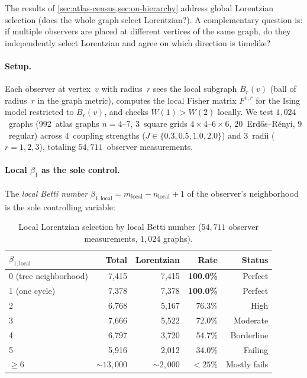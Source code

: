 \documentclass[11pt]{article}
\theoremstyle{definition}
\theoremstyle{remark}
\begin{document}
The results of \cref{sec:atlas-census,sec:on-hierarchy} address global
Lorentzian selection (does the whole graph select Lorentzian?). A
complementary question is: if multiple observers are placed at different
vertices of the same graph, do they independently select Lorentzian and
agree on which direction is timelike?

\paragraph{Setup.}
Each observer at vertex~$v$ with radius~$r$ sees the local subgraph
$B_r(v)$ (ball of radius~$r$ in the graph metric), computes the local
Fisher matrix $F^{v,r}$ for the Ising model restricted to $B_r(v)$,
and checks $W(1) > W(2)$ locally.
We test $1{,}024$~graphs (992~atlas graphs $n = 4$--$7$, $3$~square grids
$4{\times}4$--$6{\times}6$, $20$~Erd\H{o}s--R\'{e}nyi, $9$~regular) across
4~coupling strengths ($J \in \{0.3, 0.5, 1.0, 2.0\}$) and 3~radii
($r = 1, 2, 3$), totaling $54{,}711$~observer measurements.

\paragraph{Local $\beta_1$ as the sole control.}
The \emph{local Betti number} $\beta_{1,\mathrm{local}} = m_{\mathrm{local}} - n_{\mathrm{local}} + 1$
of the observer's neighborhood is the sole controlling variable:

\begin{table}[htbp]
\centering
\caption{Local Lorentzian selection by local Betti number ($54{,}711$ observer
measurements, $1{,}024$ graphs).}
\label{tab:multi-observer-beta1}
\begin{tabular}{@{}lrrrr@{}}
\toprule
$\beta_{1,\mathrm{local}}$ & Total & Lorentzian & Rate & Status \\
\midrule
0 (tree neighborhood)  & 7,415 & 7,415 & \textbf{100.0\%} & Perfect \\
1 (one cycle)          & 7,378 & 7,378 & \textbf{100.0\%} & Perfect \\
2 & 6,768 & 5,167 & 76.3\% & High \\
3 & 7,666 & 5,522 & 72.0\% & Moderate \\
4 & 6,797 & 3,720 & 54.7\% & Borderline \\
5 & 5,916 & 2,012 & 34.0\% & Failing \\
$\geq 6$ & ${\sim}13{,}000$ & ${\sim}2{,}000$ & $< 25\%$ & Mostly fails \\
\bottomrule
\end{tabular}
\end{table}
\end{document}
